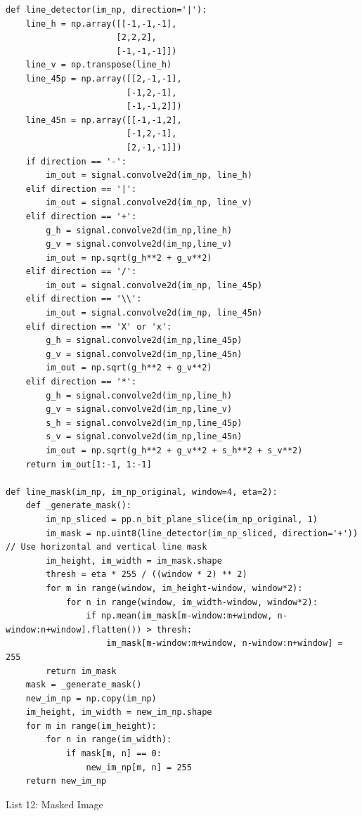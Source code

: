 \documentclass[titlepage]{article}
\begin{document}
\begin{listing}
\begin{verbatim}
def line_detector(im_np, direction='|'):
    line_h = np.array([[-1,-1,-1],
                      [2,2,2],
                      [-1,-1,-1]])
    line_v = np.transpose(line_h)
    line_45p = np.array([[2,-1,-1],
                        [-1,2,-1],
                        [-1,-1,2]])
    line_45n = np.array([[-1,-1,2],
                        [-1,2,-1],
                        [2,-1,-1]])
    if direction == '-':
        im_out = signal.convolve2d(im_np, line_h)
    elif direction == '|':
        im_out = signal.convolve2d(im_np, line_v)
    elif direction == '+':
        g_h = signal.convolve2d(im_np,line_h)
        g_v = signal.convolve2d(im_np,line_v)
        im_out = np.sqrt(g_h**2 + g_v**2)
    elif direction == '/':
        im_out = signal.convolve2d(im_np, line_45p)
    elif direction == '\\':
        im_out = signal.convolve2d(im_np, line_45n)
    elif direction == 'X' or 'x':
        g_h = signal.convolve2d(im_np,line_45p)
        g_v = signal.convolve2d(im_np,line_45n)
        im_out = np.sqrt(g_h**2 + g_v**2)
    elif direction == '*':
        g_h = signal.convolve2d(im_np,line_h)
        g_v = signal.convolve2d(im_np,line_v)
        s_h = signal.convolve2d(im_np,line_45p)
        s_v = signal.convolve2d(im_np,line_45n)
        im_out = np.sqrt(g_h**2 + g_v**2 + s_h**2 + s_v**2)
    return im_out[1:-1, 1:-1]

def line_mask(im_np, im_np_original, window=4, eta=2):
    def _generate_mask():
        im_np_sliced = pp.n_bit_plane_slice(im_np_original, 1)
        im_mask = np.uint8(line_detector(im_np_sliced, direction='+')) // Use horizontal and vertical line mask 
        im_height, im_width = im_mask.shape
        thresh = eta * 255 / ((window * 2) ** 2)
        for m in range(window, im_height-window, window*2):
            for n in range(window, im_width-window, window*2):
                if np.mean(im_mask[m-window:m+window, n-window:n+window].flatten()) > thresh:
                    im_mask[m-window:m+window, n-window:n+window] = 255
        return im_mask
    mask = _generate_mask()
    new_im_np = np.copy(im_np)
    im_height, im_width = new_im_np.shape
    for m in range(im_height):
        for n in range(im_width):
            if mask[m, n] == 0:
                new_im_np[m, n] = 255
    return new_im_np 
\end{verbatim}
\centering
\caption{List 12: Masked Image}
\newline
\end{listing}
\end{document}
